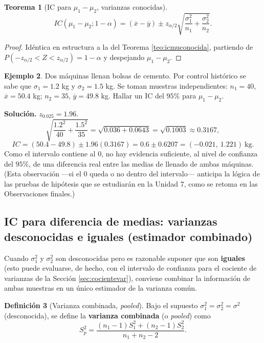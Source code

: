 \documentclass[11pt,a4paper]{article}
\theoremstyle{plain}
\newtheorem{teorema}{Teorema}[section]
\theoremstyle{definition}
\newtheorem{definicion}[teorema]{Definición}
\newtheorem{ejemplo}[teorema]{Ejemplo}
\theoremstyle{remark}
\begin{document}
\begin{teorema}[IC para $\mu_1-\mu_2$, varianzas conocidas]
\[
IC(\mu_1-\mu_2;1-\alpha) = (\overline x-\overline y) \pm z_{\alpha/2}\sqrt{\frac{\sigma_1^2}{n_1}+\frac{\sigma_2^2}{n_2}}.
\]
\end{teorema}

\begin{proof}
Idéntica en estructura a la del Teorema \ref{teo:icmuconocida}, partiendo de $P(-z_{\alpha/2}<Z<z_{\alpha/2})=1-\alpha$ y despejando $\mu_1-\mu_2$.
\end{proof}

\begin{ejemplo}
Dos máquinas llenan bolsas de cemento. Por control histórico se sabe que $\sigma_1=1.2$ kg y $\sigma_2=1.5$ kg. Se toman muestras independientes: $n_1=40$, $\overline x=50.4$ kg; $n_2=35$, $\overline y=49.8$ kg. Hallar un IC del $95\%$ para $\mu_1-\mu_2$.

\textbf{Solución.} $z_{0.025}=1.96$.
\[
\sqrt{\frac{1.2^2}{40}+\frac{1.5^2}{35}} = \sqrt{0.036+0.0643} = \sqrt{0.1003}\approx 0.3167,
\]
\[
IC = (50.4-49.8)\pm 1.96(0.3167) = 0.6\pm 0.6207 = (-0.021,\ 1.221)\ \text{kg}.
\]
Como el intervalo contiene al $0$, no hay evidencia suficiente, al nivel de confianza del $95\%$, de una diferencia real entre las medias de llenado de ambas máquinas. (Esta observación —si el $0$ queda o no dentro del intervalo— anticipa la lógica de las pruebas de hipótesis que se estudiarán en la Unidad 7, como se retoma en las Observaciones finales.)
\end{ejemplo}

\subsection{IC para diferencia de medias: varianzas desconocidas e iguales (estimador combinado)}

Cuando $\sigma_1^2$ y $\sigma_2^2$ son desconocidas pero es razonable suponer que son \textbf{iguales} (esto puede evaluarse, de hecho, con el intervalo de confianza para el cociente de varianzas de la Sección \ref{sec:cocientevar}), conviene combinar la información de ambas muestras en un único estimador de la varianza común.

\begin{definicion}[Varianza combinada, \emph{pooled}]
Bajo el supuesto $\sigma_1^2=\sigma_2^2=\sigma^2$ (desconocida), se define la \textbf{varianza combinada} (o \emph{pooled}) como
\[
S_p^2 = \frac{(n_1-1)S_1^2+(n_2-1)S_2^2}{n_1+n_2-2}.
\]
\end{definicion}
\end{document}
